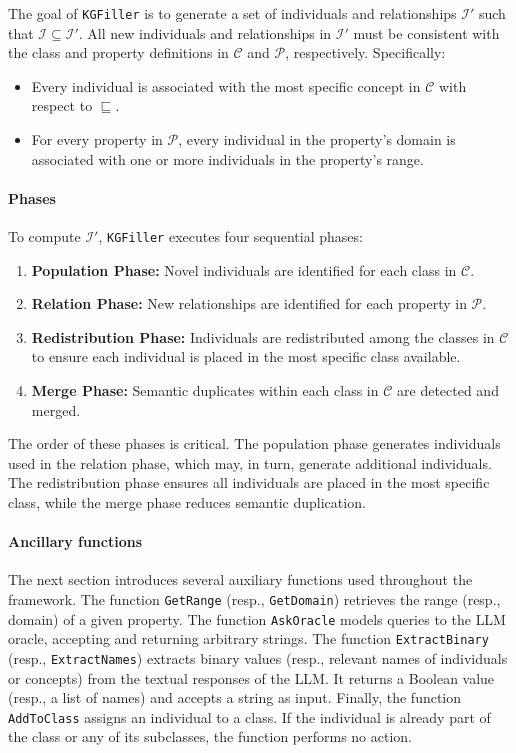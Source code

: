 %

The goal of \texttt{KGFiller} is to generate a set of individuals and relationships \(\mathcal{I}'\) such that \(\mathcal{I} \subseteq \mathcal{I}'\).
%
All new individuals and relationships in \(\mathcal{I}'\) must be consistent with the class and property definitions in \(\mathcal{C}\) and \(\mathcal{P}\), respectively.
%
Specifically:
%
\begin{itemize}
    \item Every individual is associated with the most specific concept in \(\mathcal{C}\) with respect to \(\sqsubseteq\).
    \item For every property in \(\mathcal{P}\), every individual in the property’s domain is associated with one or more individuals in the property’s range.
\end{itemize}


\paragraph{Phases}
To compute \(\mathcal{I}'\), \texttt{KGFiller} executes four sequential phases:
%
\begin{enumerate}
    \item \textbf{Population Phase:} Novel individuals are identified for each class in \(\mathcal{C}\).
    \item \textbf{Relation Phase:} New relationships are identified for each property in \(\mathcal{P}\).
    \item \textbf{Redistribution Phase:} Individuals are redistributed among the classes in \(\mathcal{C}\) to ensure each individual is placed in the most specific class available.
    \item \textbf{Merge Phase:} Semantic duplicates within each class in \(\mathcal{C}\) are detected and merged.
\end{enumerate}
%
The order of these phases is critical.
%
The population phase generates individuals used in the relation phase, which may, in turn, generate additional individuals.
%
The redistribution phase ensures all individuals are placed in the most specific class, while the merge phase reduces semantic duplication.


\paragraph{Ancillary functions}
%
The next section introduces several auxiliary functions used throughout the framework.
%
The function \texttt{GetRange} (resp., \texttt{GetDomain}) retrieves the range (resp., domain) of a given property.
%
The function \texttt{AskOracle} models queries to the \gls{LLM} oracle, accepting and returning arbitrary strings.
%
The function \texttt{ExtractBinary} (resp., \texttt{ExtractNames}) extracts binary values (resp., relevant names of individuals or concepts) from the textual responses of the \gls{LLM}.
%
It returns a Boolean value (resp., a list of names) and accepts a string as input.
%
Finally, the function \texttt{AddToClass} assigns an individual to a class.
%
If the individual is already part of the class or any of its subclasses, the function performs no action.


